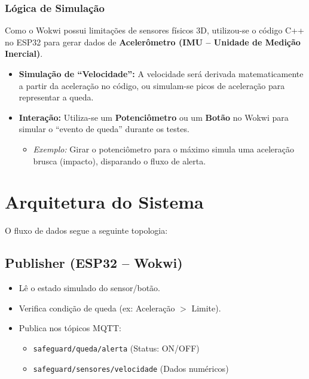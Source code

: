 \documentclass[a4paper,12pt]{article}
\begin{document}
\subsubsection{Lógica de Simulação}

Como o Wokwi possui limitações de sensores físicos 3D, utilizou-se o código C++ no ESP32 para gerar dados de \textbf{Acelerômetro (IMU -- Unidade de Medição Inercial)}.

\begin{itemize}[leftmargin=2cm]
    \item \textbf{Simulação de ``Velocidade'':} A velocidade será derivada matematicamente a partir da aceleração no código, ou simulam-se picos de aceleração para representar a queda.

    \item \textbf{Interação:} Utiliza-se um \textbf{Potenciômetro} ou um \textbf{Botão} no Wokwi para simular o ``evento de queda'' durante os testes.

    \begin{itemize}
        \item \textit{Exemplo:} Girar o potenciômetro para o máximo simula uma aceleração brusca (impacto), disparando o fluxo de alerta.
    \end{itemize}
\end{itemize}

\section{Arquitetura do Sistema}

O fluxo de dados segue a seguinte topologia:

\subsection{Publisher (ESP32 -- Wokwi)}

\begin{itemize}
    \item Lê o estado simulado do sensor/botão.
    \item Verifica condição de queda (ex: Aceleração $>$ Limite).
    \item Publica nos tópicos MQTT:
    \begin{itemize}
        \item \texttt{safeguard/queda/alerta} (Status: ON/OFF)
        \item \texttt{safeguard/sensores/velocidade} (Dados numéricos)
    \end{itemize}
\end{itemize}
\end{document}
